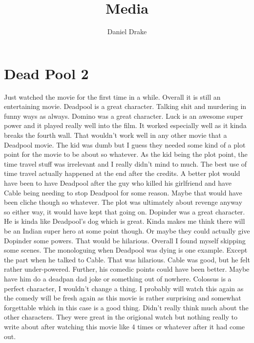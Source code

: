 \documentclass[12pt]{extarticle}
\title{Media}
\author{Daniel Drake}
\theoremstyle{plain}
\theoremstyle{plain}
\theoremstyle{plain}
\theoremstyle{Definition}
\theoremstyle{Definition}
\theoremstyle{plain}
\theoremstyle{plain}
\begin{document}
	\maketitle
	\section{Dead Pool 2}
	Just watched the movie for the first time in a while. Overall it is still an entertaining movie. Deadpool is a great character. Talking shit and murdering in funny ways as always. Domino was a great character. Luck is an awesome super power and it played really well into the film. It worked especially well as it kinda breaks the fourth wall. That wouldn't work well in any other movie that a Deadpool movie. The kid was dumb but I guess they needed some kind of a plot point for the movie to be about so whatever. As the kid being the plot point, the time travel stuff was irrelevant and I really didn't mind to much. The best use of time travel actually happened at the end after the credits. A better plot would have been to have Deadpool after the guy who killed his girlfriend and have Cable being needing to stop Deadpool for some reason. Maybe that would have been cliche though so whatever. The plot was ultimately about revenge anyway so either way, it would have kept that going on. Dopinder was a great character. He is kinda like Deadpool's dog which is great. Kinda makes me think there will be an Indian super hero at some point though. Or maybe they could actually give Dopinder some powers. That would be hilarious. Overall I found myself skipping some scenes. The monologuing when Deadpool was dying is one example. Except the part when he talked to Cable. That was hilarious. Cable was good, but he felt rather under-powered. Further, his comedic points could have been better. Maybe have him do a deadpan dad joke or something out of nowhere. Colossus is a perfect character, I wouldn't change a thing. I probably will watch this again as the comedy will be fresh again as this movie is rather surprising and somewhat forgettable which in this case is a good thing. Didn't really think much about the other characters. They were great in the origional watch but nothing really to write about after watching this movie like 4 times or whatever after it had come out. 
	
\end{document}
